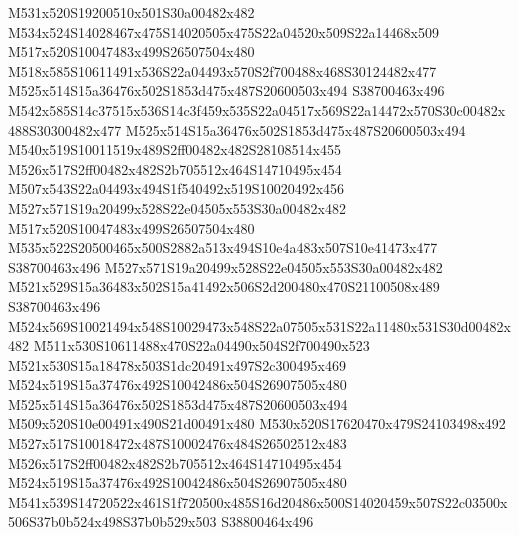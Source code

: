 \documentclass{article}
\begin{document}
\begin{multicols}{2}
M531x520S19200510x501S30a00482x482 M534x524S14028467x475S14020505x475S22a04520x509S22a14468x509 M517x520S10047483x499S26507504x480 M518x585S10611491x536S22a04493x570S2f700488x468S30124482x477 M525x514S15a36476x502S1853d475x487S20600503x494 S38700463x496 M542x585S14c37515x536S14c3f459x535S22a04517x569S22a14472x570S30c00482x488S30300482x477 M525x514S15a36476x502S1853d475x487S20600503x494 M540x519S10011519x489S2ff00482x482S28108514x455 M526x517S2ff00482x482S2b705512x464S14710495x454 M507x543S22a04493x494S1f540492x519S10020492x456 M527x571S19a20499x528S22e04505x553S30a00482x482 M517x520S10047483x499S26507504x480 M535x522S20500465x500S2882a513x494S10e4a483x507S10e41473x477 S38700463x496 M527x571S19a20499x528S22e04505x553S30a00482x482 M521x529S15a36483x502S15a41492x506S2d200480x470S21100508x489 S38700463x496 M524x569S10021494x548S10029473x548S22a07505x531S22a11480x531S30d00482x482 M511x530S10611488x470S22a04490x504S2f700490x523 M521x530S15a18478x503S1dc20491x497S2c300495x469 M524x519S15a37476x492S10042486x504S26907505x480 M525x514S15a36476x502S1853d475x487S20600503x494 M509x520S10e00491x490S21d00491x480 M530x520S17620470x479S24103498x492 M527x517S10018472x487S10002476x484S26502512x483 M526x517S2ff00482x482S2b705512x464S14710495x454 M524x519S15a37476x492S10042486x504S26907505x480 M541x539S14720522x461S1f720500x485S16d20486x500S14020459x507S22c03500x506S37b0b524x498S37b0b529x503 S38800464x496




\end{multicols}
\end{document}
